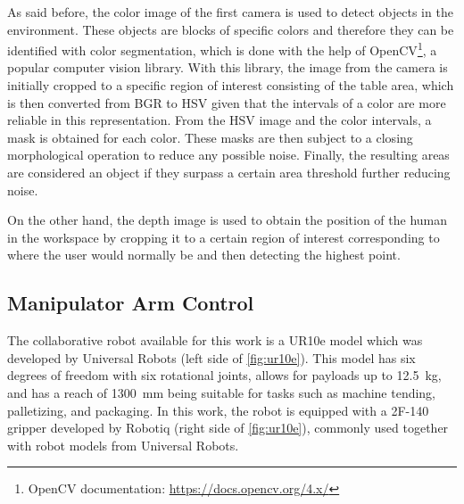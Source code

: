 As said before, the color image of the first camera is used to detect objects in the environment. These objects are blocks of specific colors and therefore they can be identified with color segmentation, which is done with the help of OpenCV\footnote{OpenCV documentation: \url{https://docs.opencv.org/4.x/}}, a popular computer vision library. With this library, the image from the camera is initially cropped to a specific region of interest consisting of the table area, which is then converted from BGR to HSV given that the intervals of a color are more reliable in this representation. From the HSV image and the color intervals, a mask is obtained for each color. These masks are then subject to a closing morphological operation to reduce any possible noise. Finally, the resulting areas are considered an object if they surpass a certain area threshold further reducing noise.

On the other hand, the depth image is used to obtain the position of the human in the workspace by cropping it to a certain region of interest corresponding to where the user would normally be and then detecting the highest point.

\subsection{Manipulator Arm Control}
\label{subsection:manipulator_arm_control}

The collaborative robot available for this work is a UR10e model which was developed by Universal Robots (left side of \autoref{fig:ur10e}). This model has six degrees of freedom with six rotational joints, allows for payloads up to \SI{12.5}{\kilogram}, and has a reach of \SI{1300}{\milli\metre} being suitable for tasks such as machine tending, palletizing, and packaging\cite{UR10e}. In this work, the robot is equipped with a 2F-140 gripper developed by Robotiq (right side of \autoref{fig:ur10e}), commonly used together with robot models from Universal Robots\cite{robotiq_gripper}.


